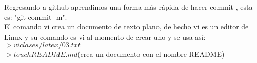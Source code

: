 \documentclass[letterpaper, 12pt, oneside]{article}%
\begin{document}
	Regresando a github aprendimos una forma más rápida de hacer commit , esta es: "git commit -m".\\
	El comando vi crea un documento de texto plano, de hecho vi es un editor de Linux y su comando es vi al momento de crear uno y se usa así:\\
	$>vi clases/latex/03.txt$\\
	$>touch README.md$(crea un documento con el nombre README)\\	
	

	
	
	
	
	
	
	
	
\end{document}
